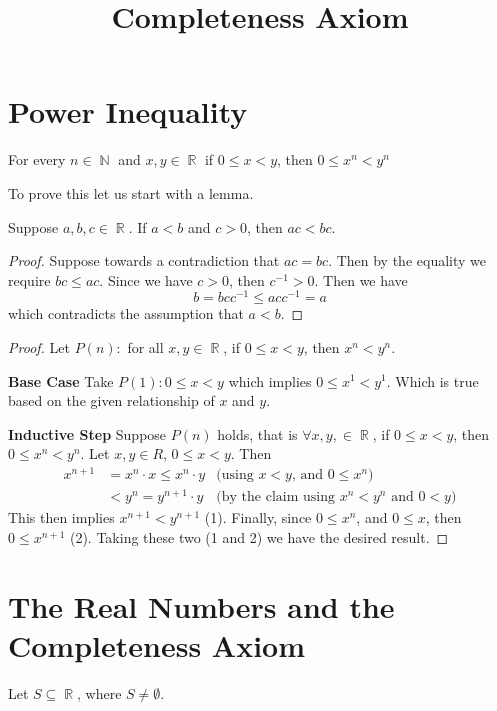 \documentclass[a4paper, 11pt]{article}
\title{Completeness Axiom}
\DeclareMathOperator{\N}{\mathbb{N}}
\DeclareMathOperator{\R}{\mathbb{R}}
\begin{document}
\tableofcontents

\section{Power Inequality}
\begin{theorem}
For every $n \in \N$ and $x, y \in \R$ if $0 \leq x < y$, then $0 \leq x^{n} < y^{n}$
\end{theorem}

To prove this let us start with a lemma.
\begin{lemma}
Suppose $a, b, c \in \R$. If $a < b$ and $c > 0$, then $ac < bc$.
\end{lemma}
\begin{proof}
Suppose towards a contradiction that $ac = bc$. Then by the equality we require $bc \leq ac$. Since we have $c > 0$, then $c^{-1} > 0$. Then we have
\begin{equation*}
  b = bcc^{-1} \leq acc^{-1} = a
\end{equation*}
which contradicts the assumption that $a < b$.
\end{proof}

\begin{proof}
Let $P(n):$ for all $x, y \in \R$, if $0 \leq x < y$, then $x^{n} < y^{n}$.

\textbf{Base Case}\newline
Take $P(1): 0 \leq x < y$ which implies $0 \leq x^1 < y^1$. Which is true based on the given relationship of $x$ and $y$.

\textbf{Inductive Step}\newline
Suppose $P(n)$ holds, that is $\forall x, y, \in \R$, if $0\leq x < y$, then $0 \leq x^n < y^n$. Let $x, y \in R$, $0\leq x < y$.
Then 
\begin{align*}
  x^{n+1} &= x^n \cdot x \leq x^n \cdot y &\text{(using $x < y$, and $0 \leq x^n$)} \\
  &<y^n = y^{n+1} \cdot y &\text{(by the claim using $x^n < y^n$ and $0 < y$)}
\end{align*}
This then implies $x^{n+1} < y^{n+1}$ (1). Finally, since $0 \leq x^n$, and $0 \leq x$, then $0 \leq x^{n+1}$ (2). Taking these two (1 and 2)
we have the desired result.

\end{proof}

\section{The Real Numbers and the Completeness Axiom}
Let $S \subseteq \R$, where $S \neq \emptyset$.
\end{document}
